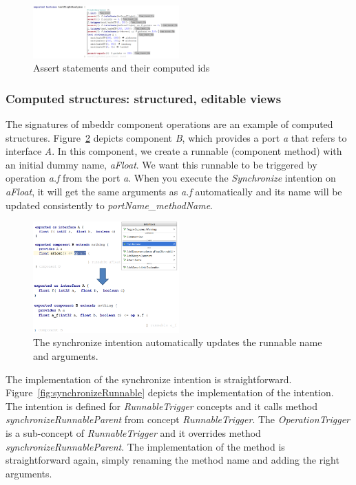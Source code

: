 \documentclass[preprint,numbers,10pt]{sigplanconf}
\begin{document}
\begin{figure}[H]
	\centering
	\includegraphics[width=0.50\textwidth]{screens/testFlightAnalyzer.png}
	\caption{Assert statements and their computed ids}
	\label{fig:asserts}
\end{figure}
\subsubsection{Computed structures: structured, editable views}
The signatures of mbeddr component operations are an example of computed structures.
Figure~\ref{fig:ComputedStructures} depicts component \emph{B}, which provides a port \emph{a} that refers to interface \emph{A}.
In this component, we create a runnable (component method) with an initial dummy name, \emph{aFloat}. We want this
runnable to be triggered by operation \emph{a.f} from the port \emph{a}.
When you execute the \emph{Synchronize} intention on \emph{aFloat}, it will get the same arguments as \emph{a.f}
automatically and its name will be updated consistently to \emph{portName\_methodName}.

\begin{figure}[H]
	\centering
	\includegraphics[width=0.50\textwidth]{screens/ComputedStructures.png}
	\caption{The synchronize intention automatically updates the runnable name and arguments.}
	\label{fig:ComputedStructures}
\end{figure}

The implementation of the synchronize intention is straightforward. Figure~\ref{fig:synchronizeRunnable}
depicts the implementation of the intention. The intention is defined for \emph{RunnableTrigger} concepts
and it calls method \emph{synchronizeRunnableParent} from concept \emph{RunnableTrigger}. The \emph{OperationTrigger}
is a sub-concept of \emph{RunnableTrigger} and it overrides method \emph{synchronizeRunnableParent}. The implementation
of the method is straightforward again, simply renaming the method name and adding the right arguments.
\end{document}
